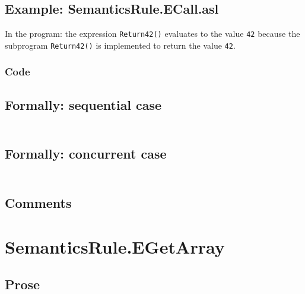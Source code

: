 \documentclass{book}
\begin{document}
  \subsection{Example: SemanticsRule.ECall.asl}
    In the program:
    the expression \texttt{Return42()} evaluates to the value \texttt{42} because the
    subprogram \texttt{Return42()} is implemented to return the value \texttt{42}.

  \subsubsection{Code}

  \subsection{Formally: sequential case}
  \begin{align}
  \end{align} 

  \subsection{Formally: concurrent case}
  \begin{align}
  \end{align} 

  \subsection{Comments}

\section{SemanticsRule.EGetArray \label{sec:SemanticsRule.EGetArray}}

  \subsection{Prose}
\end{document}
